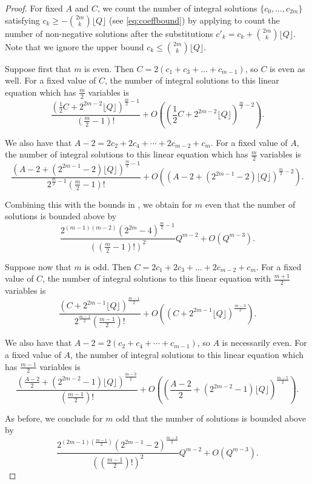 \documentclass[12pt]{amsart}
\newcommand{\floor}[1]{\lfloor {#1} \rfloor}
\theoremstyle{plain}
\begin{document}
\begin{proof}
For fixed $A$ and $C$, we count the number of integral solutions $\{c_0,\dots,c_{2m}\}$ satisfying $c_k\geq -\binom{2m}{k}\floor{Q}$ (see \eqref{eq:coeffbound}) by applying  to count the number of non-negative solutions after the substitutions $c'_k=c_k+\binom{2m}{k}\floor{Q}$. Note that we ignore the upper bound $c_k\leq \binom{2m}{k}\floor{Q}$.

Suppose first that $m$ is even. Then $C=2(c_1+c_3+\dots+c_{m-1})$, so $C$ is even as well. For a fixed value of $C$, the number of integral solutions to this linear equation which has $\frac{m}{2}$ variables is
\[ \frac{\left( \frac{1}{2}C+2^{2m-2}\floor{Q} \right)^{\frac{m}{2}-1}}{(\frac{m}{2}-1)!} + O\left( \left( \frac{1}{2}C+2^{2m-2}\floor{Q} \right)^{\frac{m}{2}-2} \right). \]

We also have that $A-2=2c_2+2c_4+\cdots+2c_{m-2}+c_m$. For a fixed value of $A$, the number of integral solutions to this linear equation which has $\frac{m}{2}$ variables is
\[ \frac{\left( A-2+(2^{2m-1}-2)\floor{Q} \right)^{\frac{m}{2}-1}}{2^{\frac{m}{2}-1}(\frac{m}{2}-1)!} + O\left( \left( A-2+(2^{2m-1}-2)\floor{Q} \right)^{\frac{m}{2}-2} \right). \]   


Combining this with the bounds in , we obtain for $m$ even that the number of solutions is bounded above by 
\[
    \frac{2^{(m-1)(m-2)}(2^{2m}-4)^{\frac{m}{2}-1}}{\left( (\frac{m}{2}-1)! \right)^2} Q^{m-2} + O(Q^{m-3}).
\]

Suppose now that $m$ is odd. Then $C=2c_1+2c_3+\dots+2c_{m-2}+c_m$. For a fixed value of $C$, the number of integral solutions to this linear equation with $\frac{m+1}{2}$ variables is 
\[ \frac{\left( C+2^{2m-1}\floor{Q} \right)^{\frac{m-1}{2}}}{2^{\frac{m-1}{2}}(\frac{m-1}{2})!} + O\left( \left( C+2^{2m-1}\floor{Q} \right)^{\frac{m-3}{2}} \right). \]

We also have that $A-2=2(c_2+c_4+\cdots+c_{m-1})$, so $A$ is necessarily even. For a fixed value of $A$, the number of integral solutions to this linear equation which has $\frac{m-1}{2}$ variables is
\[ \frac{\left( \frac{A-2}{2}+(2^{2m-2}-1)\floor{Q} \right)^{\frac{m-3}{2}}}{(\frac{m-1}{2})!} + O\left( \left( \frac{A-2}{2}+(2^{2m-2}-1)\floor{Q} \right)^{\frac{m-5}{2}} \right). \]

As before, we conclude for $m$ odd that the number of solutions is bounded above by 
\[
    \frac{2^{(2m-1)(\frac{m-1}{2})}(2^{2m-1}-2)^{\frac{m-3}{2}}}{\left( (\frac{m-1}{2})! \right)^2} Q^{m-2} + O(Q^{m-3}).
\]
\end{proof}
\end{document}
